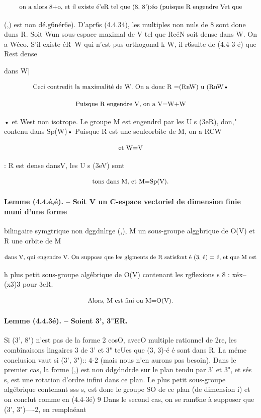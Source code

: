 \documentclass[11pt]{article}
\theoremstyle{remark}
\begin{document}
\[\text{\small on a alors 8+o, et il existe é'eR tel que (8, 8'):éo (puisque R engendre Vet que}\]

(,) est non dé.g6nér6e). D'apr6s (4.4.34), les multiples non nuls de 8 sont done duns R. Soit Wun sous-espace maximal de V tel que RcéN soit dense dans W. On a Wéeo. S'il existe éR--W qui n'est pus orthogonal k W, il r6sulte de (4.4-3 é) que Rest dense

dans W|

\[\text{\small Ceci contredit la maximalité de W. On a donc R =(RnW) u (RnW•}\]

\[\text{\small Puisque R engendre V, on a V=W+W}\]

• et West non isotrope. Le groupe M est engendrd par les U s (3eR), don," contenu dans Sp(W)• Puisque R est une seuleorbite de M, on a RCW

\[\text{\small et W=V}\]

: R est dense dansV, les U s (3eV) sont

\[\text{\small tons dans M, et M=Sp(V).}\]

\paragraph{Lemme (4.4.é,é). -- Soit V un C-espace vectoriel de dimension finie muni d'une forme}

bilingaire symgtrique non dggdnlrge (,), M un sous-groupe alggbrique de O(V) et R une orbite de M

\[\text{\small dans V, qui engendre V. On suppose que les glgments de R satisfont é (3, é) = é, et que M est}\]

h plus petit sous-groupe algébrique de O(V) contenant les rgflexions s 8 : xéx--(x3)3 pour 3eR.

\[\text{\small Alors, M est fini ou M=O(V).}\]

\paragraph{Lemme (4.4.3é). -- Soient 3', 3"ER.}

Si (3', 8") n'est pas de la forme 2 cosO, avecO multiple rationnel de 2re, les combinaisons lingaires 3 de 3' et 3" teUes que (3, 3)-é é sont dans R. La méme conclusion vaut si (3', 3"):: 4-2 (mais nous n'en aurons pas besoin). Dans le premier cas, la forme (,) est non ddgdndrde sur le plan tendu par 3' et 3", et sés s, est une rotation d'ordre infini dans ce plan. Le plus petit sous-groupe algébrique contenant sss s, est done le groupe SO de ce plan (de dimension i) et on conclut comme en (4.4-3é)  9 Dans le second cas, on se ram6ne à supposer que (3', 3")----2, en remplaéant
\end{document}
